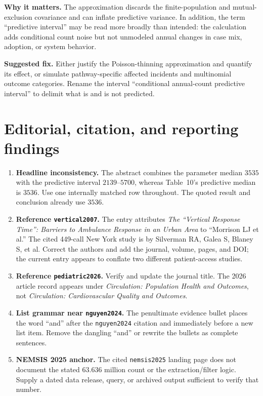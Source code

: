 \documentclass[11pt]{article}
\begin{document}
\textbf{Why it matters.} The approximation discards the finite-population and
mutual-exclusion covariance and can inflate predictive variance.  In addition,
the term ``predictive interval'' may be read more broadly than intended: the
calculation adds conditional count noise but not unmodeled annual changes in
case mix, adoption, or system behavior.

\textbf{Suggested fix.} Either justify the Poisson-thinning approximation and
quantify its effect, or simulate pathway-specific affected incidents and
multinomial outcome categories.  Rename the interval ``conditional annual-count
predictive interval'' to delimit what is and is not predicted.

\section*{Editorial, citation, and reporting findings}

\begin{enumerate}
\item \textbf{Headline inconsistency.} The abstract combines the parameter
median $3535$ with the predictive interval $2139$--$5700$, whereas Table~10's
predictive median is $3536$.  Use one internally matched row throughout.  The
quoted result and conclusion already use $3536$.

\item \textbf{Reference \texttt{vertical2007}.} The entry attributes
\emph{The ``Vertical Response Time'': Barriers to Ambulance Response in an
Urban Area} to ``Morrison LJ et al.''  The cited 449-call New York study is by
Silverman RA, Galea S, Blaney S, et al.  Correct the authors and add the journal,
volume, pages, and DOI; the current entry appears to conflate two different
patient-access studies.

\item \textbf{Reference \texttt{pediatric2026}.} Verify and update the journal
title.  The 2026 article record appears under \emph{Circulation: Population
Health and Outcomes}, not \emph{Circulation: Cardiovascular Quality and
Outcomes}.

\item \textbf{List grammar near \texttt{nguyen2024}.} The penultimate evidence
bullet places the word ``and'' after the \texttt{nguyen2024} citation and
immediately before a new list item.  Remove the dangling ``and'' or rewrite the
bullets as complete sentences.

\item \textbf{NEMSIS 2025 anchor.} The cited \texttt{nemsis2025} landing page
does not document the stated $63.636$ million count or the extraction/filter
logic.  Supply a dated data release, query, or archived output sufficient to
verify that number.
\end{enumerate}
\end{document}
